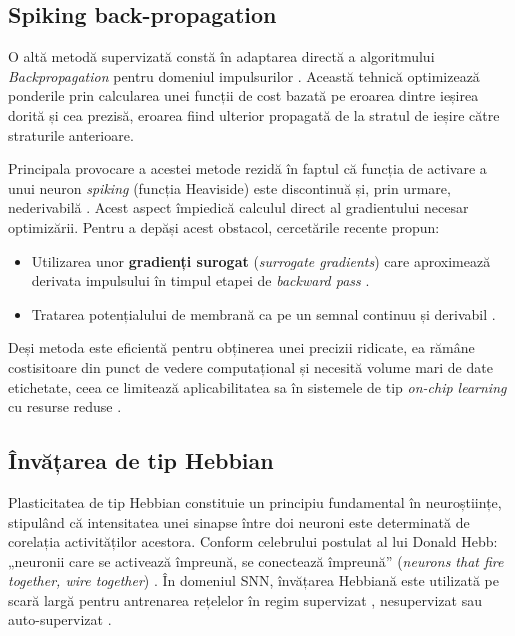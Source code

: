 \subsection*{Spiking back-propagation}
O altă metodă supervizată constă în adaptarea directă a algoritmului \textit{Backpropagation} pentru domeniul impulsurilor \cite{grum23}. Această tehnică optimizează ponderile prin calcularea unei funcții de cost bazată pe eroarea dintre ieșirea dorită și cea prezisă, eroarea fiind ulterior propagată de la stratul de ieșire către straturile anterioare.

Principala provocare a acestei metode rezidă în faptul că funcția de activare a unui neuron \textit{spiking} (funcția Heaviside) este discontinuă și, prin urmare, nederivabilă \cite{lee2016}. Acest aspect împiedică calculul direct al gradientului necesar optimizării. Pentru a depăși acest obstacol, cercetările recente propun:
\begin{itemize}
    \item Utilizarea unor \textbf{gradienți surogat} (\textit{surrogate gradients}) care aproximează derivata impulsului în timpul etapei de \textit{backward pass} \cite{tavanaei2019deep}.
    \item Tratarea potențialului de membrană ca pe un semnal continuu și derivabil \cite{lee2016}.
\end{itemize}

Deși metoda este eficientă pentru obținerea unei precizii ridicate, ea rămâne costisitoare din punct de vedere computațional și necesită volume mari de date etichetate, ceea ce limitează aplicabilitatea sa în sistemele de tip \textit{on-chip learning} cu resurse reduse \cite{lee2018_frontiers}.

\subsection*{Învățarea de tip Hebbian}

Plasticitatea de tip Hebbian constituie un principiu fundamental în neuroștiințe, stipulând că intensitatea unei sinapse între doi neuroni este determinată de corelația activităților acestora. Conform celebrului postulat al lui Donald Hebb: „neuronii care se activează împreună, se conectează împreună” (\textit{neurons that fire together, wire together}) \cite{hebb2002}. În domeniul SNN, învățarea Hebbiană este utilizată pe scară largă pentru antrenarea rețelelor în regim supervizat \cite{lan2022pcsnn}, nesupervizat \cite{kheradpisheh2018stdp} sau auto-supervizat \cite{halvagal2023combination}.

